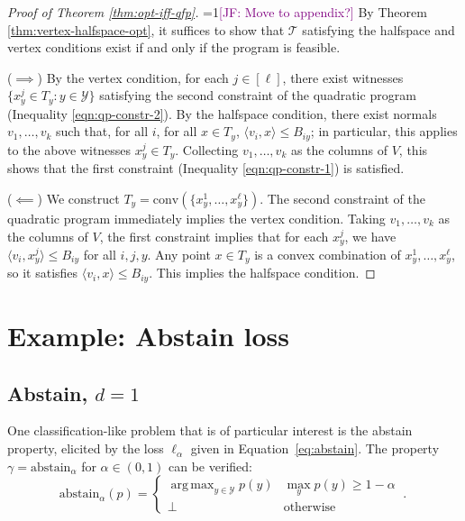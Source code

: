 \documentclass[anon]{colt2020} %
\newcommand{\Comments}{1}
\newcommand{\mynote}[2]{\ifnum\Comments=1\textcolor{#1}{#2}\fi}
\newcommand{\jessie}[1]{\mynote{purple}{[JF: #1]}}
\newcommand{\abstain}[1]{\mathrm{abstain}_{#1}}
\newcommand{\T}{\mathcal{T}}
\newcommand{\Y}{\mathcal{Y}}
\newcommand{\ellabs}[1]{\ell_{#1}}
\newcommand{\inprod}[2]{\langle #1, #2 \rangle}%
\newcommand{\conv}{\mathrm{conv}}
\DeclareMathOperator*{\argmax}{arg\,max}
\begin{document}
\begin{proof}[Proof of Theorem \ref{thm:opt-iff-qfp}]
	\jessie{Move to appendix?}
    By Theorem \ref{thm:vertex-halfspace-opt}, it suffices to show that $\T$ satisfying the halfspace and vertex conditions exist if and only if the program is feasible.

  ($\implies$)
  By the vertex condition, for each $j \in [\ell]$, there exist witnesses $\{x^j_y \in T_y : y \in \Y\}$ satisfying the second constraint of the quadratic program (Inequality \ref{eqn:qp-constr-2}).
  By the halfspace condition, there exist normals $v_1, \dots, v_k$ such that, for all $i$, for all $x \in T_y$, $\inprod{v_i}{x} \leq B_{iy}$; in particular, this applies to the above witnesses $x^j_y \in T_y$.
  Collecting $v_1,\dots,v_k$ as the columns of $V$, this shows that the first constraint (Inequality \ref{eqn:qp-constr-1}) is satisfied.

  \bigskip
  ($\impliedby$)
  We construct $T_y = \conv(\{x^1_y, \ldots, x^{\ell}_y\})$.
  The second constraint of the quadratic program immediately implies the vertex condition.
  Taking $v_1,\dots,v_k$ as the columns of $V$, the first constraint implies that for each $x^j_y$, we have $\inprod{v_i}{x^j_y} \leq B_{iy}$ for all $i,j,y$.
  Any point $x \in T_y$ is a convex combination of $x^1_y,\ldots,x^{\ell}_y$, so it satisfies $\inprod{v_i}{x} \leq B_{iy}$.
  This implies the halfspace condition.  %
\end{proof}




\section{Example: Abstain loss}\label{sec:examples}
\subsection{Abstain, $d=1$}\label{subsec:abstain-d1}
One classification-like problem that is of particular interest is the abstain property, elicited by the loss $\ellabs{\alpha}$ given in Equation~\eqref{eq:abstain}.
The property $\gamma = \abstain{\alpha}$ for $\alpha \in (0,1)$ can be verified:
\begin{equation}\label{eq:abstain-prop}
     \abstain{\alpha}(p) = \begin{cases}
     \argmax_{y \in \Y} p(y) & \max_y p(y) \geq 1 - \alpha\\
     \bot & \text{otherwise}
     \end{cases}~.~
\end{equation}
\end{document}
